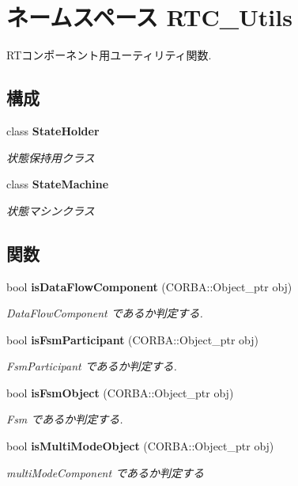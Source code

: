 \section{ネームスペース RTC\_\-Utils}
\label{namespaceRTC__Utils}


RTコンポーネント用ユーティリティ関数.  


\subsection*{構成}
\begin{DoxyCompactItemize}
\item 
class {\bf StateHolder}
\begin{DoxyCompactList}\small\item\em 状態保持用クラス \item\end{DoxyCompactList}\item 
class {\bf StateMachine}
\begin{DoxyCompactList}\small\item\em 状態マシンクラス \item\end{DoxyCompactList}\end{DoxyCompactItemize}
\subsection*{関数}
\begin{DoxyCompactItemize}
\item 
bool {\bf isDataFlowComponent} (CORBA::Object\_\-ptr obj)
\begin{DoxyCompactList}\small\item\em DataFlowComponent であるか判定する. \item\end{DoxyCompactList}\item 
bool {\bf isFsmParticipant} (CORBA::Object\_\-ptr obj)
\begin{DoxyCompactList}\small\item\em FsmParticipant であるか判定する. \item\end{DoxyCompactList}\item 
bool {\bf isFsmObject} (CORBA::Object\_\-ptr obj)
\begin{DoxyCompactList}\small\item\em Fsm であるか判定する. \item\end{DoxyCompactList}\item 
bool {\bf isMultiModeObject} (CORBA::Object\_\-ptr obj)
\begin{DoxyCompactList}\small\item\em multiModeComponent であるか判定する \item\end{DoxyCompactList}\end{DoxyCompactItemize}



